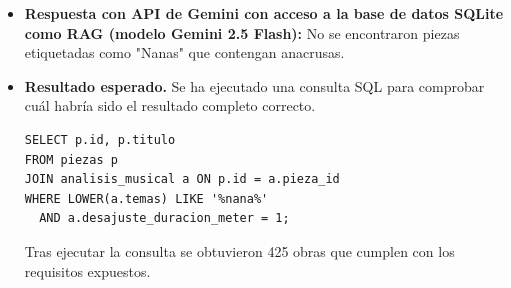 \begin{itemize}
**Anacrusa en música tradicional**

En la música tradicional irlandesa y escocesa, a menudo se usan patrones métricos complejos, como el compás de 6/8 o 9/8. En estos casos, es común que el primer compás no siga exactamente el patrón establecido por la música subsecuente.

**Ejemplos**

* ""The Wind That Shakes the Barley"" (una canción irlandesa tradicional): La primera estrofa tiene una estructura anacrúsica, con un compás de 6/8 que comienza en el segundo o tercer tiempo.
* ""Loch Lomond"" (una balada escocesa tradicional): La primera estrofa también tiene una estructura anacrúsica, con un compás de 4/4 que comienza en el segundo tiempo.

**¿Dónde encontrar más ejemplos?**

Para encontrar más ejemplos de anacrusas en música tradicional irlandesa y escocesa, te recomiendo buscar:

* Fuentes en línea como Mutopia o IMSLP
* Publicaciones sobre música tradicional irlandesa y escocesa, como ""The Complete Book of Irish Music"" o ""Scottish Folk Music""
* Recopilaciones de música folk y tradicional en streaming servicios como Spotify

Recuerda que la música tradicional a menudo tiene una gran variabilidad y flexibilidad en sus patrones métricos. ¡Espero que esta información te sea útil!"
\item \textbf{Respuesta con API de Gemini con acceso a la base de datos SQLite como RAG (modelo Gemini 2.5 Flash):} No se encontraron piezas etiquetadas como "Nanas" que contengan anacrusas.
    \item \textbf{Resultado esperado.} Se ha ejecutado una consulta SQL para comprobar cuál habría sido el resultado completo correcto.
    \begin{verbatim}
SELECT p.id, p.titulo
FROM piezas p
JOIN analisis_musical a ON p.id = a.pieza_id
WHERE LOWER(a.temas) LIKE '%nana%'
  AND a.desajuste_duracion_meter = 1;
    \end{verbatim} 
    Tras ejecutar la consulta se obtuvieron 425 obras que cumplen con los requisitos expuestos.


\end{itemize}
